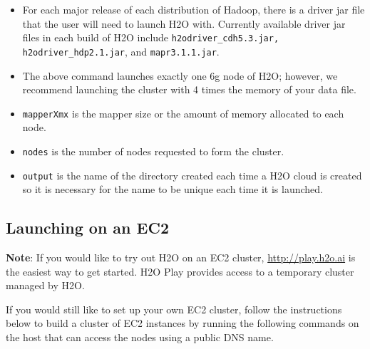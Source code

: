 \begin{itemize}
\item For each major release of each distribution of Hadoop, there is a driver jar file that the user will need to launch H2O with. Currently available driver jar files in each build of H2O include {\texttt{h2odriver\_cdh5.3.jar, h2odriver\_hdp2.1.jar}}, and {\texttt{mapr3.1.1.jar}}.
\item The above command launches exactly one 6g node of H2O; however,  we recommend launching the cluster with 4 times the memory of your data file.
\item{\texttt{mapperXmx}} is the mapper size or the amount of memory allocated to each node.
\item{\texttt{nodes}} is the number of nodes requested to form the cluster.
\item{\texttt{output}} is the name of the directory created each time a H2O cloud is created so it is necessary for the name to be unique each time it is launched.
\end{itemize}


\subsection{Launching on an EC2}

{\textbf{Note}}: If you would like to try out H2O on an EC2 cluster, {\url{http://play.h2o.ai}} is the easiest way to get started. H2O Play provides access to a temporary cluster managed by H2O. 

If you would still like to set up your own EC2 cluster, follow the instructions below to build a cluster of EC2 instances by running the following commands on the host that can access the nodes using a public DNS name. 

